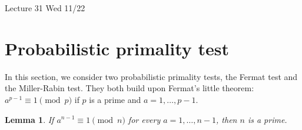 \documentclass{article}
\def\Z{{\mathbb Z}}
\def\Z{{\mathbb Z}}
\newtheorem{lemma}[subsection]{Lemma}
\newcommand{\add}[1]{{\color{blue} #1}}
\begin{document}
\begin{comment}
A similar method can be used for the general discrete logarithm problem: given $M$, $C$ and $n$, find $d$ such that $M\equiv C^d\pmod{n}$. We use a two variable version of the above. 
\begin{enumerate}
    \item Compute $M^\alpha C^{-\beta}$ mod $n$ for all non-negative integers $\alpha,\beta < o_n(C)$ at the same time.

    We get a superposition of $|\alpha, \beta, M^\alpha C^{-\beta}\mbox{ mod }n\rangle.$ Measuring the third registry gives a random $c_0$ and superposition of states $|\alpha,\beta\rangle$ such that $M^\alpha C^{-\beta}\equiv c_0\pmod{n}.$ These pairs of integers $(\alpha,\beta)$ are of the form
    $$(\alpha_0,\beta_0), (\alpha_0 + 1, \beta_0 + d), (\alpha_0 + 2, \beta_0 + 2d), \ldots$$
    \item Apply QFT.
\end{enumerate}

\subsection*{Exercises}
\begin{enumerate}[\thesection .1]
    \item Prove that if $n$ is an odd prime power, then $x^2 \equiv 1\pmod{n}$ if and only if $x\equiv\pm1\pmod{n}$.
    \item Suppose $n = pq$ is a product of two distinct odd primes. Find the number of $b\in (\Z/n\Z)^\times$ such that $o_n(b)$ is odd or $b^{o_n(b)/2}\equiv -1\pmod{n}$.
\end{enumerate}
\end{comment}


\begin{center}
    \add{Lecture 31 Wed 11/22}
\end{center}

\section{Probabilistic primality test}
In this section, we consider two probabilistic primality tests, the Fermat test and the Miller-Rabin test. They both build upon Fermat's little theorem: $a^{p-1}\equiv 1\pmod{p}$ if $p$ is a prime and $a = 1,\ldots,p-1$.

\begin{lemma}
    If $a^{n-1}\equiv 1\pmod{n}$ for every $a = 1,\ldots,n-1$, then $n$ is a prime.
\end{lemma}
\end{document}
